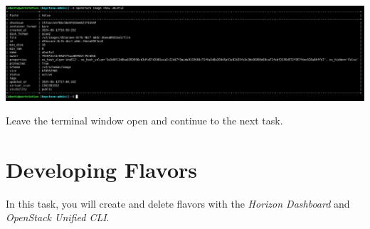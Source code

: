 \documentclass[letterpaper, 12pt]{article}
\begin{document}
\begin{enumerate}
\begin{labstep}
        \begin{center}
            \includegraphics[width=\linewidth]{images/part1/step23.png}
        \end{center}
    \end{labstep}

    \begin{labstep}
        Leave the terminal window open and continue to the next task.
    \end{labstep}

\end{enumerate}

\section{Developing Flavors}\label{sec:developing_flavors}
In this task, you will create and delete flavors with the \textit{Horizon Dashboard} and \textit{OpenStack Unified CLI}.
\end{document}
